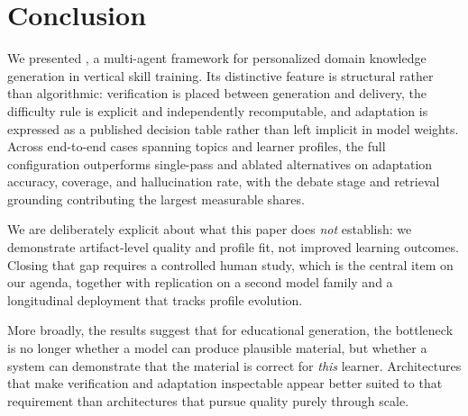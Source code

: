 \section{Conclusion}
\label{sec:conclusion}

We presented \sysname{}, a multi-agent framework for personalized domain
knowledge generation in vertical skill training. Its distinctive feature is
structural rather than algorithmic: verification is placed between generation
and delivery, the difficulty rule is explicit and independently recomputable,
and adaptation is expressed as a published decision table rather than left
implicit in model weights. Across  end-to-end cases spanning
 topics and  learner profiles, the full configuration
outperforms single-pass and ablated alternatives on adaptation accuracy,
coverage, and hallucination rate, with the debate stage and retrieval
grounding contributing the largest measurable shares.

We are deliberately explicit about what this paper does \emph{not} establish:
we demonstrate artifact-level quality and profile fit, not improved learning
outcomes. Closing that gap requires a controlled human study, which is the
central item on our agenda, together with replication on a second model family
and a longitudinal deployment that tracks profile evolution.

More broadly, the results suggest that for educational generation, the
bottleneck is no longer whether a model can produce plausible material, but
whether a system can demonstrate that the material is correct for \emph{this}
learner. Architectures that make verification and adaptation inspectable
appear better suited to that requirement than architectures that pursue
quality purely through scale.
